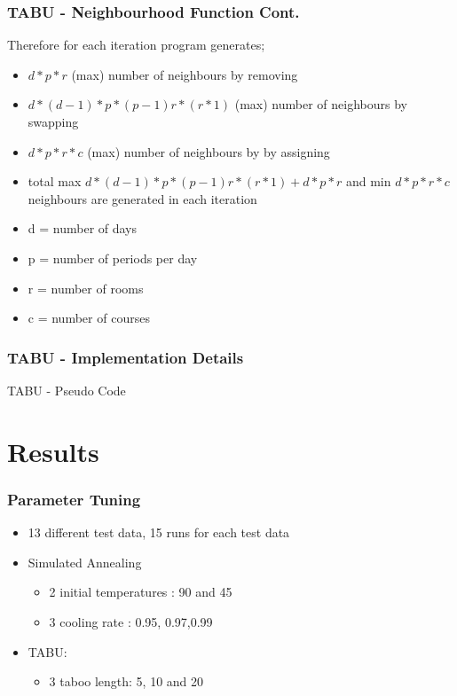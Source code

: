 \documentclass{beamer}
\makeatletter
\newenvironment{algorithm}[1][]{%
  \def\@captype{algorithm}%
  \par\nobreak\begin{center}\nobreak}
  {\par\nobreak\end{center}\nobreak}
\newcounter{algorithm}
\makeatother
\begin{document}
\begin{frame}
\frametitle{TABU - Neighbourhood Function Cont.}
Therefore for each iteration program generates;
\begin{itemize}
\item  $ d*p*r$ (max) number of neighbours by removing
\item  $d*(d-1)*p*(p-1)r*(r*1) $ (max) number of neighbours by swapping 
\item $ d*p*r*c$ (max) number of neighbours by by assigning
\item total max $d*(d-1)*p*(p-1)r*(r*1) + d*p*r $ and min $ d*p*r*c$ neighbours are generated in each iteration
\item d = number of days
\item p = number of periods per day
\item r = number of rooms
\item c = number of courses
\end{itemize}
\end{frame}

\begin{frame}[allowframebreaks] 
\frametitle{TABU  - Implementation Details}
\begin{algorithm}[H]
\begin{algorithmic}[1]
\REPEAT
{}
\ENDIF
{}
\ENDIF
{}
\end{algorithmic}
\caption{TABU - Pseudo Code}
\label{alg:seq}
\end{algorithm}
\end{frame}

\section{Results}

\begin{frame}
\frametitle{Parameter Tuning}
\begin{itemize}
\item 13 different test data, 15 runs for each test data
\item Simulated Annealing 
\begin{itemize}
\item 2 initial temperatures : 90 and 45
\item  3 cooling rate : 0.95, 	0.97,0.99
\end{itemize}
\item TABU: 
\begin{itemize}
\item 3 taboo length: 5, 10 and 20
\end{itemize}
\end{itemize}

\end{frame}
\end{document}

